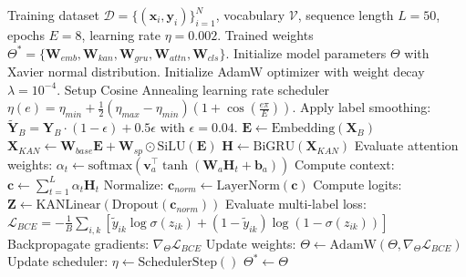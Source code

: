 \documentclass[conference]{IEEEtran}
\begin{document}
\begin{algorithm}[t]
\caption{KAN-GRU Multi-Label V2X Training and Classification}
\label{alg:kangru}
\begin{algorithmic}[1]
\REQUIRE Training dataset $\mathcal{D} = \{(\mathbf{x}_i, \mathbf{y}_i)\}_{i=1}^N$, vocabulary $\mathcal{V}$, sequence length $L=50$, epochs $E=8$, learning rate $\eta=0.002$.
\ENSURE Trained weights $\Theta^* = \{\mathbf{W}_{emb}, \mathbf{W}_{kan}, \mathbf{W}_{gru}, \mathbf{W}_{attn}, \mathbf{W}_{cls}\}$.
\STATE Initialize model parameters $\Theta$ with Xavier normal distribution.
\STATE Initialize AdamW optimizer with weight decay $\lambda = 10^{-4}$.
\STATE Setup Cosine Annealing learning rate scheduler $\eta(e) = \eta_{min} + \frac{1}{2}(\eta_{max} - \eta_{min})(1 + \cos(\frac{e \pi}{E}))$.
        \STATE Apply label smoothing: $\tilde{\mathbf{Y}}_B = \mathbf{Y}_B \cdot (1 - \epsilon) + 0.5\epsilon$ with $\epsilon=0.04$.
        \STATE $\mathbf{E} \leftarrow \text{Embedding}(\mathbf{X}_B)$
        \STATE $\mathbf{X}_{KAN} \leftarrow \mathbf{W}_{base} \mathbf{E} + \mathbf{W}_{sp} \odot \text{SiLU}(\mathbf{E})$
        \STATE $\mathbf{H} \leftarrow \text{BiGRU}(\mathbf{X}_{KAN})$
        \STATE Evaluate attention weights: $\alpha_t \leftarrow \text{softmax}(\mathbf{v}_a^\top \tanh(\mathbf{W}_a \mathbf{H}_t + \mathbf{b}_a))$
        \STATE Compute context: $\mathbf{c} \leftarrow \sum_{t=1}^L \alpha_t \mathbf{H}_t$
        \STATE Normalize: $\mathbf{c}_{norm} \leftarrow \text{LayerNorm}(\mathbf{c})$
        \STATE Compute logits: $\mathbf{Z} \leftarrow \text{KANLinear}(\text{Dropout}(\mathbf{c}_{norm}))$
        \STATE Evaluate multi-label loss: $\mathcal{L}_{BCE} = -\frac{1}{B} \sum_{i,k} [\tilde{y}_{ik} \log \sigma(z_{ik}) + (1 - \tilde{y}_{ik}) \log(1 - \sigma(z_{ik}))]$
        \STATE Backpropagate gradients: $\nabla_\Theta \mathcal{L}_{BCE}$
        \STATE Update weights: $\Theta \leftarrow \text{AdamW}(\Theta, \nabla_\Theta \mathcal{L}_{BCE})$
    \ENDFOR
    \STATE Update scheduler: $\eta \leftarrow \text{SchedulerStep}()$
\ENDFOR
\RETURN $\Theta^* \leftarrow \Theta$
\end{algorithmic}
\end{algorithm}
\end{document}
